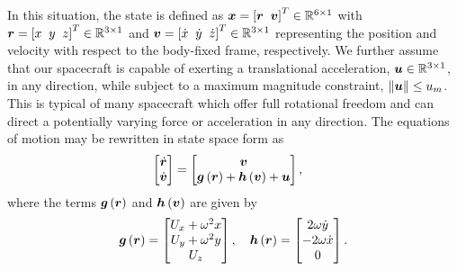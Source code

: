 \documentclass[]{aiaa-tc}%
\begin{document}
In this situation, the state is defined as \( \bm{x} = \left[ \bm{r}~\>\bm{v} \right]^T \in \mathbb{R}^{6 \times 1}\) with \(\bm{r} = \left[ x~\>y~\>z \right]^T \in \mathbb{R}^{3\times1}\) and \(\bm{v}= \left[  \dot{x}~\>\dot{y}~\>\dot{z}  \right]^T \in \mathbb{R}^{3\times1}\) representing the position and velocity with respect to the body-fixed frame, respectively.
We further assume that our spacecraft is capable of exerting a translational acceleration, \( \bm{u} \in \mathbb{R}^{3\times1} \), in any direction, while subject to a maximum magnitude constraint, \( \left\| \bm{u} \right\| \leq u_m \).
This is typical of many spacecraft which offer full rotational freedom and can direct a potentially varying force or acceleration in any direction.
The equations of motion may be rewritten in state space form as
\begin{align}\label{eq:state_space_eoms}
    \begin{bmatrix} \dot{\bm{r}} \\ \dot{\bm{v}} \end{bmatrix} &=
    \begin{bmatrix}\bm{v} \\ \bm{g} \left( \bm{r} \right) + \bm{h}\left( \bm{v} \right) + \bm{u} \end{bmatrix} ,
\end{align}
where the terms \(\bm{g} \left( \bm{r} \right) \) and \( \bm{h}\left( \bm{v} \right) \) are given by
\begin{align}\label{eq:state_space_terms}
    \bm{g}\left( \bm{r} \right) = \begin{bmatrix}  U_x + \omega^2 x \\ U_y + \omega^2 y \\ U_z \end{bmatrix} ,\quad
    \bm{h}\left( \bm{r} \right) = \begin{bmatrix} 2 \omega \dot{y} \\ -2 \omega \dot{x} \\ 0 \end{bmatrix} .
\end{align}
\end{document}
